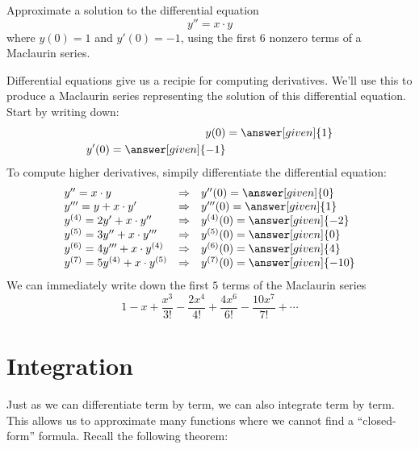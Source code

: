 \documentclass{ximera}
\begin{document}
\begin{example}
  Approximate a solution to the differential equation
  \[
  y'' = x\cdot y
  \]
  where $y(0) = 1$ and $y'(0) = -1$, using the first $6$ nonzero terms
  of a Maclaurin series.
  \begin{explanation}
    Differential equations give us a recipie for computing
    derivatives. We'll use this to produce a Maclaurin series
    representing the solution of this differential equation.  Start by
    writing down:
    \begin{align*}
    y(0) &= \answer[given]{1}\\
    y'(0) = \answer[given]{-1}
    \end{align*}
    To compute higher derivatives, simpily differentiate the
    differential equation:
    \[
    \begin{array}{lcl}
      y'' = x\cdot y & \Rightarrow & y''(0) = \answer[given]{0}\\
      y''' = y + x\cdot y' & \Rightarrow & y'''(0) = \answer[given]{1}\\
      y^{(4)} = 2y' + x\cdot y'' & \Rightarrow & y^{(4)}(0) = \answer[given]{-2}\\
      y^{(5)} = 3y'' + x\cdot y''' & \Rightarrow & y^{(5)}(0) =\answer[given]{0}\\
      y^{(6)} = 4y''' + x\cdot y^{(4)} & \Rightarrow & y^{(6)}(0) =\answer[given]{4}\\
      y^{(7)} = 5y^{(4)} + x\cdot y^{(5)} & \Rightarrow & y^{(7)}(0) =\answer[given]{-10}
    \end{array}
    \]
    We can immediately write down the first $5$ terms of the Maclaurin series
    \[
    1 -x + \frac{x^3}{3!} -\frac{2x^4}{4!} + \frac{4x^6}{6!} -\frac{10x^7}{7!} +\cdots
    \]
  \end{explanation}
\end{example}

\section{Integration}

Just as we can differentiate term by term, we can also integrate term
by term. This allows us to approximate many functions where we cannot
find a ``closed-form'' formula. Recall the following theorem:
\end{document}
